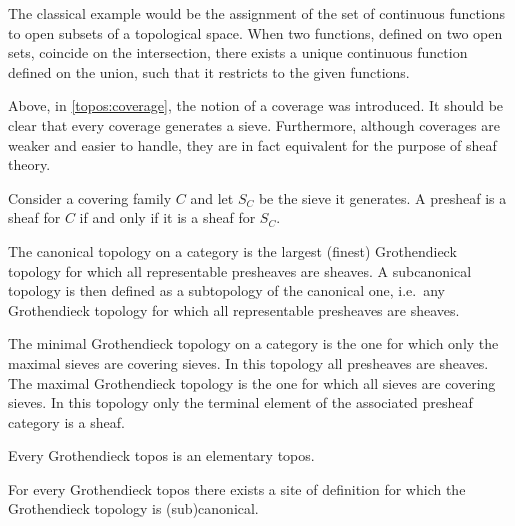 \begin{example}
        The classical example would be the assignment of the set of continuous functions to open subsets of a topological space. When two functions, defined on two open sets, coincide on the intersection, there exists a unique continuous function defined on the union, such that it restricts to the given functions.
    \end{example}

    Above, in \cref{topos:coverage}, the notion of a coverage was introduced. It should be clear that every coverage generates a sieve. Furthermore, although coverages are weaker and easier to handle, they are in fact equivalent for the purpose of sheaf theory.
    \begin{property}
        Consider a covering family $C$ and let $S_C$ be the sieve it generates. A presheaf is a sheaf for $C$ if and only if it is a sheaf for $S_C$.
    \end{property}

    \begin{example}
        The canonical topology on a category is the largest (finest) Grothendieck topology for which all representable presheaves are sheaves. A subcanonical topology is then defined as a subtopology of the canonical one, i.e.~any Grothendieck topology for which all representable presheaves are sheaves.
    \end{example}
    \begin{example}
        The minimal Grothendieck topology on a category is the one for which only the maximal sieves are covering sieves. In this topology all presheaves are sheaves. The maximal Grothendieck topology is the one for which all sieves are covering sieves. In this topology only the terminal element of the associated presheaf category is a sheaf.
    \end{example}

    \begin{property}
        Every Grothendieck topos is an elementary topos.
    \end{property}

    \begin{property}
        For every Grothendieck topos there exists a site of definition for which the Grothendieck topology is (sub)canonical.
    \end{property}

